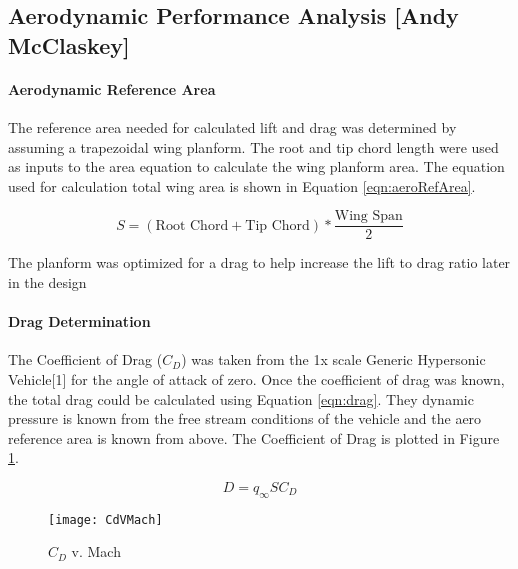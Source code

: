\subsection{Aerodynamic Performance Analysis [Andy McClaskey]}
\paragraph{Aerodynamic Reference Area}
The reference area needed for calculated lift and drag was determined by assuming a trapezoidal wing planform. The root and tip chord length were used as inputs to the area equation to calculate the wing planform area. The equation used for calculation total wing area is shown in Equation \ref{eqn:aeroRefArea}.

\begin{equation}
\label{eqn:aeroRefArea}
S = (\text{Root Chord} + \text{Tip Chord})*\frac{\text{Wing Span}}{2}
\end{equation}

The planform was optimized for a drag to help increase the lift to drag ratio later in the design

\paragraph{Drag Determination}

The Coefficient of Drag ($C_D$) was taken from the 1x scale Generic Hypersonic Vehicle[1] for the angle of attack of zero. Once the coefficient of drag was known, the total drag could be calculated using Equation \ref{eqn:drag}. They dynamic pressure is known from the free stream conditions of the vehicle and the aero reference area is known from above. The Coefficient of Drag is plotted in Figure \ref{fig:CdVMach}.

\begin{equation}
\label{eqn:drag}
D = q_{\infty}SC_D
\end{equation}

\begin{figure}[H]
\begin{center}
\texttt{[image: CdVMach]}
\caption{$C_D$ v. Mach}
\label{fig:CdVMach}
\end{center}
\end{figure}

\begin{comment}
The total drag for the vehicle is shown in Figure \ref{fig:dragVMach}.

\begin{figure}[H]
\begin{center}
\texttt{[image: dragVMach]}
\caption{Drag v. Mach}
\label{fig:dragVMach}
\end{center}
\end{figure}

\end{comment}

